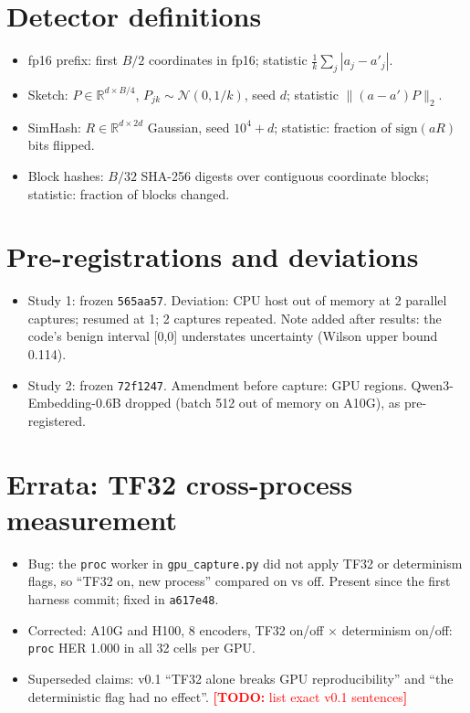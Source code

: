 \documentclass{article}
\newcommand{\todo}[1]{\textcolor{red}{\textbf{[TODO:} #1\textbf{]}}}
\newcommand{\cond}[1]{\texttt{#1}}
\begin{document}
\section{Detector definitions}\label{app:detectors}
\begin{itemize}
  \item fp16 prefix: first $B/2$ coordinates in fp16; statistic $\tfrac{1}{k}\sum_j |a_j-a'_j|$.
  \item Sketch: $P\in\mathbb R^{d\times B/4}$, $P_{jk}\sim\mathcal N(0,1/k)$, seed $d$; statistic $\lVert (a-a')P\rVert_2$.
  \item SimHash: $R\in\mathbb R^{d\times 2d}$ Gaussian, seed $10^4+d$; statistic: fraction of $\mathrm{sign}(aR)$ bits flipped.
  \item Block hashes: $B/32$ SHA-256 digests over contiguous coordinate blocks; statistic: fraction of blocks changed.
\end{itemize}

\section{Pre-registrations and deviations}\label{app:prereg}
\begin{itemize}
  \item Study 1: frozen \texttt{565aa57}. Deviation: CPU host out of memory at 2 parallel captures; resumed at 1; 2 captures repeated. Note added after results: the code's benign interval [0,0] understates uncertainty (Wilson upper bound 0.114).
  \item Study 2: frozen \texttt{72f1247}. Amendment before capture: GPU regions. Qwen3-Embedding-0.6B dropped (batch 512 out of memory on A10G), as pre-registered.
\end{itemize}

\section{Errata: TF32 cross-process measurement}\label{app:errata}
\begin{itemize}
  \item Bug: the \cond{proc} worker in \texttt{gpu\_capture.py} did not apply TF32 or determinism flags, so ``TF32 on, new process'' compared on vs off. Present since the first harness commit; fixed in \texttt{a617e48}.
  \item Corrected: A10G and H100, 8 encoders, TF32 on/off $\times$ determinism on/off: \cond{proc} HER 1.000 in all 32 cells per GPU.
  \item Superseded claims: v0.1 ``TF32 alone breaks GPU reproducibility'' and ``the deterministic flag had no effect''. \todo{list exact v0.1 sentences}
\end{itemize}
\end{document}
